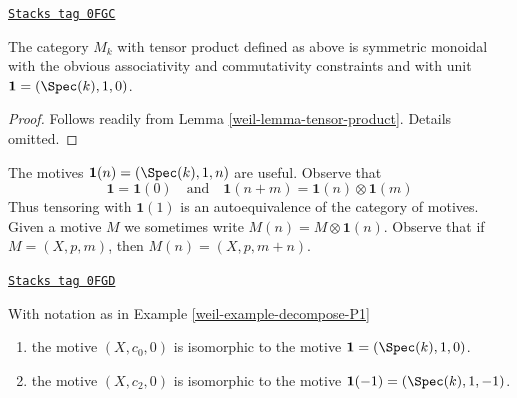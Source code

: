 \begin{lemma}
\label{weil-lemma-motives-monoidal}
\href{https://stacks.math.columbia.edu/tag/0FGC}{\texttt{Stacks tag 0FGC}}

The category $M_k$ with tensor product defined as above
is symmetric monoidal with the obvious associativity and commutativity
constraints and with unit $\mathbf{1} = (\Spec(k), 1, 0)$.
\end{lemma}

\begin{proof}

Follows readily from Lemma \ref{weil-lemma-tensor-product}. Details omitted.
\end{proof}

The motives $\mathbf{1}(n) = (\Spec(k), 1, n)$ are useful. Observe that
$$
\mathbf{1} = \mathbf{1}(0)
\quad\text{and}\quad
\mathbf{1}(n + m) = \mathbf{1}(n) \otimes \mathbf{1}(m)
$$
Thus tensoring with $\mathbf{1}(1)$ is an autoequivalence of the
category of motives. Given a motive $M$ we sometimes write
$M(n) = M \otimes \mathbf{1}(n)$. Observe that if $M = (X, p, m)$,
then $M(n) = (X, p, m + n)$.

\begin{lemma}[Inverse h2]
\label{weil-lemma-inverse-h2}
\href{https://stacks.math.columbia.edu/tag/0FGD}{\texttt{Stacks tag 0FGD}}

With notation as in Example \ref{weil-example-decompose-P1}
\begin{enumerate}
\item
the motive $(X, c_0, 0)$ is isomorphic to the motive
$\mathbf{1} = (\Spec(k), 1, 0)$.
\item
the motive $(X, c_2, 0)$ is isomorphic to the motive
$\mathbf{1}(-1) = (\Spec(k), 1, -1)$.
\end{enumerate}
\end{lemma}

